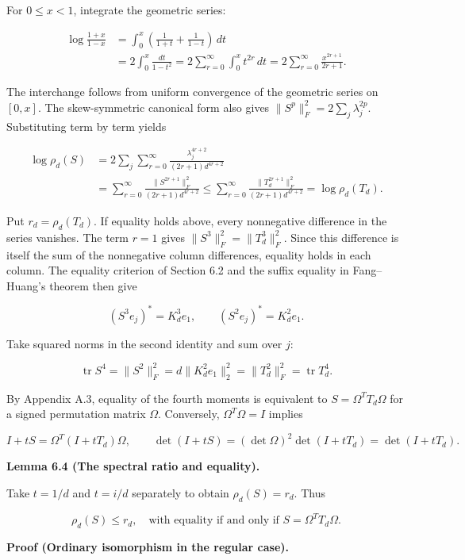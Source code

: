 \documentclass[11pt,a4paper]{article}
\begin{document}
For \(0\le x<1\), integrate the geometric series:

\[
\begin{aligned}
\log\frac{1+x}{1-x}
&=\int_0^x\left(\frac1{1+t}+\frac1{1-t}\right)\,dt\\
&=2\int_0^x\frac{dt}{1-t^2}
=2\sum_{r=0}^\infty\int_0^x t^{2r}\,dt
=2\sum_{r=0}^\infty\frac{x^{2r+1}}{2r+1}.
\end{aligned}
\]

The interchange follows from uniform convergence of the geometric series on \([0,x]\). The skew-symmetric canonical form also gives \(\|S^p\|_F^2=2\sum_j\lambda_j^{2p}\). Substituting term by term yields

\[
\begin{aligned}
\log\rho_d(S)
&=2\sum_j\sum_{r=0}^\infty
\frac{\lambda_j^{4r+2}}{(2r+1)d^{4r+2}}\\
&=\sum_{r=0}^\infty
\frac{\|S^{2r+1}\|_F^2}{(2r+1)d^{4r+2}}
\le\sum_{r=0}^\infty
\frac{\|T_d^{2r+1}\|_F^2}{(2r+1)d^{4r+2}}
=\log\rho_d(T_d).
\end{aligned}
\]

Put \(r_d=\rho_d(T_d)\). If equality holds above, every nonnegative difference in the series vanishes. The term \(r=1\) gives \(\|S^3\|_F^2=\|T_d^3\|_F^2\). Since this difference is itself the sum of the nonnegative column differences, equality holds in each column. The equality criterion of Section 6.2 and the suffix equality in Fang--Huang's theorem then give

\[
(S^3e_j)^*=K_d^3e_1,\qquad
(S^2e_j)^*=K_d^2e_1.
\]

Take squared norms in the second identity and sum over \(j\):

\[
\operatorname{tr}S^4=\|S^2\|_F^2
=d\|K_d^2e_1\|_2^2
=\|T_d^2\|_F^2=\operatorname{tr}T_d^4.
\]

By Appendix A.3, equality of the fourth moments is equivalent to \(S=\Omega^TT_d\Omega\) for a signed permutation matrix \(\Omega\). Conversely, \(\Omega^T\Omega=I\) implies

\[
I+tS=\Omega^T(I+tT_d)\Omega,\qquad
\det(I+tS)=(\det \Omega)^2\det(I+tT_d)=\det(I+tT_d).
\]

\textbf{Lemma 6.4 (The spectral ratio and equality).}

Take \(t=1/d\) and \(t=i/d\) separately to obtain \(\rho_d(S)=r_d\). Thus

\[
\rho_d(S)\le r_d,
\quad\text{with equality if and only if }S=\Omega^TT_d\Omega.
\]

\textbf{Proof (Ordinary isomorphism in the regular case).}
\end{document}
